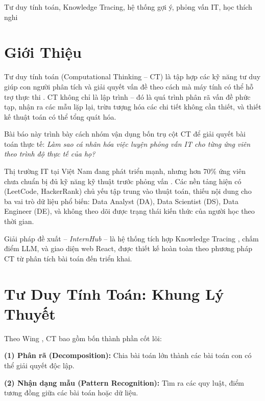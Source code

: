 \documentclass[conference]{IEEEtran}
\newcommand{\sys}{\textit{InternHub}}
\begin{document}
\begin{IEEEkeywords}
Tư duy tính toán, Knowledge Tracing, hệ thống gợi ý, phỏng vấn IT, học thích nghi
\end{IEEEkeywords}

\section{Giới Thiệu}
\label{sec:intro}

Tư duy tính toán (Computational Thinking -- CT) là tập hợp các kỹ năng tư duy giúp con người phân tích và giải quyết vấn đề theo cách mà máy tính có thể hỗ trợ thực thi \cite{wing2006computational}. CT không chỉ là lập trình -- đó là quá trình phân rã vấn đề phức tạp, nhận ra các mẫu lặp lại, trừu tượng hóa các chi tiết không cần thiết, và thiết kế thuật toán có thể tổng quát hóa.

Bài báo này trình bày cách nhóm vận dụng bốn trụ cột CT để giải quyết bài toán thực tế: \textit{Làm sao cá nhân hóa việc luyện phỏng vấn IT cho từng ứng viên theo trình độ thực tế của họ?}

Thị trường IT tại Việt Nam đang phát triển mạnh, nhưng hơn 70\% ứng viên chưa chuẩn bị đủ kỹ năng kỹ thuật trước phỏng vấn \cite{topdev2024}. Các nền tảng hiện có (LeetCode, HackerRank) chủ yếu tập trung vào thuật toán, thiếu nội dung cho ba vai trò dữ liệu phổ biến: Data Analyst (DA), Data Scientist (DS), Data Engineer (DE), và không theo dõi được trạng thái kiến thức của người học theo thời gian.

Giải pháp đề xuất -- \sys{} -- là hệ thống tích hợp Knowledge Tracing \cite{corbett1994knowledge}, chấm điểm LLM, và giao diện web React, được thiết kế hoàn toàn theo phương pháp CT từ phân tích bài toán đến triển khai.

\section{Tư Duy Tính Toán: Khung Lý Thuyết}
\label{sec:ct}

Theo Wing \cite{wing2006computational}, CT bao gồm bốn thành phần cốt lõi:

\textbf{(1) Phân rã (Decomposition):} Chia bài toán lớn thành các bài toán con có thể giải quyết độc lập.

\textbf{(2) Nhận dạng mẫu (Pattern Recognition):} Tìm ra các quy luật, điểm tương đồng giữa các bài toán hoặc dữ liệu.
\end{document}
